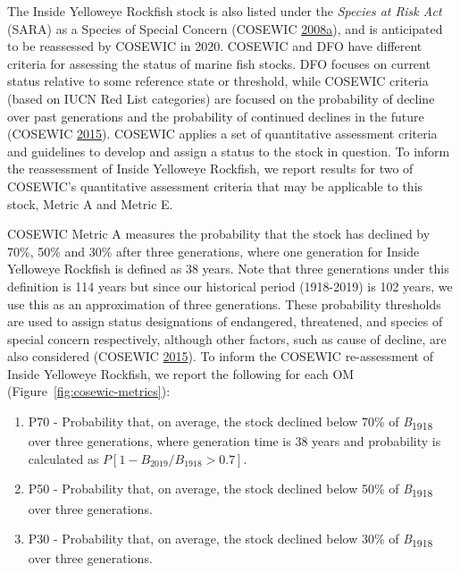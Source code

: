 \documentclass[11pt]{book}
\begin{document}
\label{app:cosewic}

The Inside Yelloweye Rockfish stock is also listed under the \emph{Species at Risk Act} (SARA) as a Species of Special Concern (COSEWIC \protect\hyperlink{ref-cosewic2008}{2008}\protect\hyperlink{ref-cosewic2008}{a}), and is anticipated to be reassessed by COSEWIC in 2020. COSEWIC and DFO have different criteria for assessing the status of marine fish stocks. DFO focuses on current status relative to some reference state or threshold, while COSEWIC criteria (based on IUCN Red List categories) are focused on the probability of decline over past generations and the probability of continued declines in the future (COSEWIC \protect\hyperlink{ref-cosewic2015}{2015}). COSEWIC applies a set of quantitative assessment criteria and guidelines to develop and assign a status to the stock in question. To inform the reassessment of Inside Yelloweye Rockfish, we report results for two of COSEWIC's quantitative assessment criteria that may be applicable to this stock, Metric A and Metric E.

\hypertarget{cosewic-metric-a}{%
\label{cosewic-metric-a}}

COSEWIC Metric A measures the probability that the stock has declined by 70\%, 50\% and 30\% after three generations, where one generation for Inside Yelloweye Rockfish is defined as 38 years. Note that three generations under this definition is 114 years but since our historical period (1918-2019) is 102 years, we use this as an approximation of three generations. These probability thresholds are used to assign status designations of endangered, threatened, and species of special concern respectively, although other factors, such as cause of decline, are also considered (COSEWIC \protect\hyperlink{ref-cosewic2015}{2015}). To inform the COSEWIC re-assessment of Inside Yelloweye Rockfish, we report the following for each OM (Figure~\ref{fig:cosewic-metrics}):
\begin{enumerate}
\def\labelenumi{\arabic{enumi}.}

\item
  P70 - Probability that, on average, the stock declined below 70\% of \emph{B}\textsubscript{1918} over three generations, where generation time is 38 years and probability is calculated as \(P[1 - B_{2019}/B_{1918} > 0.7]\).
\item
  P50 - Probability that, on average, the stock declined below 50\% of \emph{B}\textsubscript{1918} over three generations.
\item
  P30 - Probability that, on average, the stock declined below 30\% of \emph{B}\textsubscript{1918} over three generations.
\end{enumerate}
\end{document}
